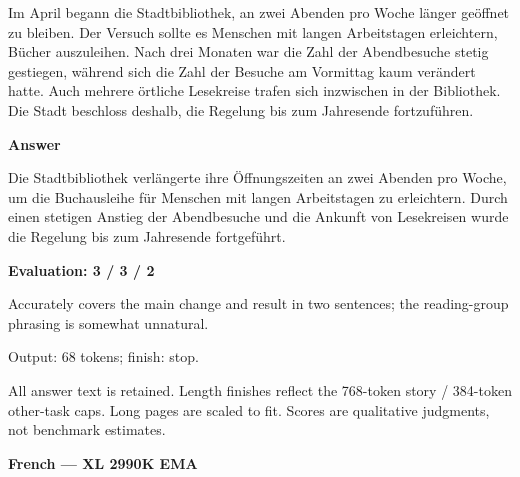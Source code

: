 \documentclass[10pt]{article}
\begin{document}
{\begin{minipage}{\textwidth}
\par\smallskip
Im April begann die Stadtbibliothek, an zwei Abenden pro Woche länger geöffnet zu bleiben. Der Versuch sollte es Menschen mit langen Arbeitstagen erleichtern, Bücher auszuleihen. Nach drei Monaten war die Zahl der Abendbesuche stetig gestiegen, während sich die Zahl der Besuche am Vormittag kaum verändert hatte. Auch mehrere örtliche Lesekreise trafen sich inzwischen in der Bibliothek. Die Stadt beschloss deshalb, die Regelung bis zum Jahresende fortzuführen.\par\smallskip
\textbf{Answer}\par Die Stadtbibliothek verlängerte ihre Öffnungszeiten an zwei Abenden pro Woche, um die Buchausleihe für Menschen mit langen Arbeitstagen zu erleichtern. Durch einen stetigen Anstieg der Abendbesuche und die Ankunft von Lesekreisen wurde die Regelung bis zum Jahresende fortgeführt.\par\smallskip
\textbf{Evaluation: 3 / 3 / 2}\par Accurately covers the main change and result in two sentences; the reading-group phrasing is somewhat unnatural.
\par {\color{gray} Output: 68 tokens; finish: stop.}\par
\medskip\footnotesize All answer text is retained. Length finishes reflect the 768-token story / 384-token other-task caps. Long pages are scaled to fit. Scores are qualitative judgments, not benchmark estimates.
\end{minipage}}%
\noindent\ifdim\dimexpr\ht\languagepage+\dp\languagepage\relax>0.93\textheight%
\resizebox*{!}{0.93\textheight}{\usebox{\languagepage}}%
\else\usebox{\languagepage}\fi%
\clearpage
{\Large\bfseries French --- XL 2990K EMA}\par\smallskip
\end{document}
